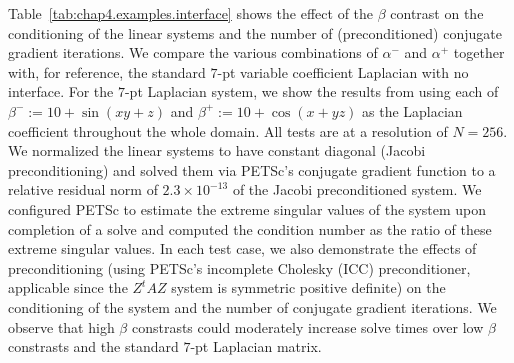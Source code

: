 Table~\ref{tab:chap4.examples.interface} shows the effect of the $\beta$ contrast on the conditioning of the linear systems and the number of (preconditioned) conjugate gradient iterations. We compare the various combinations of $\alpha^-$ and $\alpha^+$ together with, for reference, the standard $7$-pt variable coefficient Laplacian with no interface. For the $7$-pt Laplacian system, we show the results from using each of $\beta^- := 10 + \sin(xy + z)$ and $\beta^+ := 10 + \cos(x + yz)$ as the Laplacian coefficient throughout the whole domain. All tests are at a resolution of $N = 256$. We normalized the linear systems to have constant diagonal (Jacobi preconditioning) and solved them via PETSc's \cite{petsc-web-page,petsc-user-ref,petsc-efficient} conjugate gradient function to a relative residual norm of $2.3 \times 10^{-13}$ of the Jacobi preconditioned system. We configured PETSc to estimate the extreme singular values of the system upon completion of a solve and computed the condition number as the ratio of these extreme singular values. In each test case, we also demonstrate the effects of preconditioning (using PETSc's incomplete Cholesky (ICC) preconditioner, applicable since the $Z^tAZ$ system is symmetric positive definite) on the conditioning of the system and the number of conjugate gradient iterations. We observe that high $\beta$ constrasts could moderately increase solve times over low $\beta$ constrasts and the standard $7$-pt Laplacian matrix.

